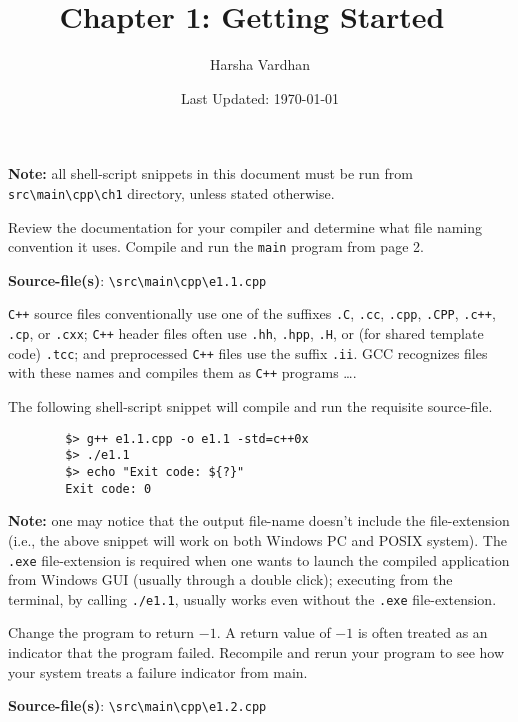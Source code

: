 \documentclass[12pt, a4paper]{article}
\begin{document}
    \title{Chapter 1: Getting Started~\cite{cpp-primer}}
    \author{Harsha Vardhan}
    \date{Last Updated: \today}

    \maketitle
    \bigskip

    \noindent\textbf{Note:} all shell-script snippets in this document must be run from \texttt{src\textbackslash main\textbackslash cpp\textbackslash ch1} directory, unless stated otherwise.
    \bigskip

    \begin{tcolorbox}[title={Exercise: 1.1}]
        Review the documentation for your compiler and determine what file naming convention it uses.
        Compile and run the \texttt{main} program from page 2.
    \end{tcolorbox}
    \noindent\textbf{Source-file(s)}: \texttt{\textbackslash src\textbackslash main\textbackslash cpp\textbackslash e1.1.cpp}

    \noindent \texttt{C++} source files conventionally use one of the suffixes \texttt{.C}, \texttt{.cc}, \texttt{.cpp}, \texttt{.CPP}, \texttt{.c++}, \texttt{.cp}, or \texttt{.cxx}; \texttt{C++} header files often use \texttt{.hh}, \texttt{.hpp}, \texttt{.H}, or (for shared template code) \texttt{.tcc}; and preprocessed \texttt{C++} files use the suffix \texttt{.ii}.
    GCC recognizes files with these names and compiles them as \texttt{C++} programs \dots \cite{gcc-manpage}.

    \noindent The following shell-script snippet will compile and run the requisite source-file.
    \begin{verbatim}
        $> g++ e1.1.cpp -o e1.1 -std=c++0x
        $> ./e1.1
        $> echo "Exit code: ${?}"
        Exit code: 0
    \end{verbatim}

    \noindent\textbf{Note:} one may notice that the output file-name doesn't include the file-extension (i.e., the above snippet will work on both Windows PC and POSIX system).
    The \texttt{.exe} file-extension is required when one wants to launch the compiled application from Windows GUI (usually through a double click); executing from the terminal, by calling \texttt{./e1.1}, usually works even without the \texttt{.exe} file-extension.

    \bigskip
    \begin{tcolorbox}[title={Exercise: 1.2}]
        Change the program to return $-1$.
        A return value of $-1$ is often treated as an indicator that the program failed.
        Recompile and rerun your program to see how your system treats a failure indicator from main.
    \end{tcolorbox}
    \noindent\textbf{Source-file(s)}: \texttt{\textbackslash src\textbackslash main\textbackslash cpp\textbackslash e1.2.cpp}
\end{document}
